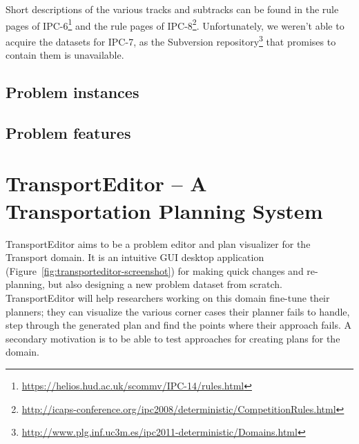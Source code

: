 Short descriptions of the various tracks and subtracks can be found in the rule pages of IPC-6\footnote{\url{https://helios.hud.ac.uk/scommv/IPC-14/rules.html}}
and the rule pages of IPC-8\footnote{\url{http://icaps-conference.org/ipc2008/deterministic/CompetitionRules.html}}.
Unfortunately, we weren't able to acquire the datasets for IPC-7, as the Subversion repository\footnote{\url{http://www.plg.inf.uc3m.es/ipc2011-deterministic/Domains.html}} that promises to contain them is unavailable.

\subsection{Problem instances}


\subsection{Problem features}



\section{TransportEditor -- A Transportation Planning System}


TransportEditor aims to be a problem editor and plan visualizer for the Transport domain.
It is an intuitive GUI desktop application (Figure~\ref{fig:transporteditor-screenshot}) for making quick changes and re-planning, but also designing a new problem dataset from scratch. TransportEditor will help researchers working on this domain fine-tune their planners; they can visualize the various corner cases their planner fails to handle, step through the generated plan and find the points where their approach fails.
A secondary motivation is to be able to test approaches for creating plans for the domain.


